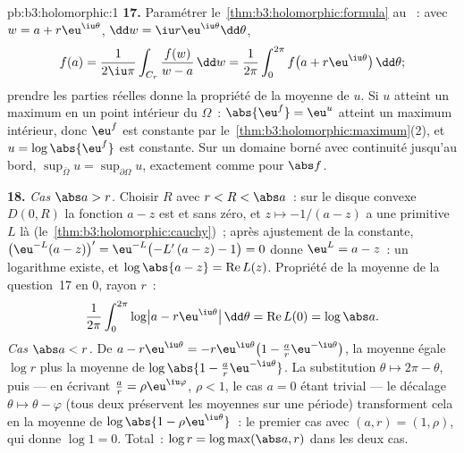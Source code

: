 \begin{solution}{pb:b3:holomorphic:1}
\textbf{17.} Paramétrer le~\cref{thm:b3:holomorphic:formula}
au ~: avec $w = a + r\eu^{\iu\theta}$, $\dd w = \iu
r\eu^{\iu\theta}\dd\theta$,
\[
f(a) = \frac1{2\iu\pi}\int_{C_r}\frac{f(w)}{w - a}\,\dd w
= \frac1{2\pi}\int_0^{2\pi}
f\bigl(a + r\eu^{\iu\theta}\bigr)\,\dd\theta ;
\]
prendre les parties réelles donne la propriété de la moyenne
de $u$. Si $u$ atteint un maximum en un point intérieur du
 $\Omega$~: $\abs{\eu^f} = \eu^u$ atteint un maximum
intérieur, donc $\eu^f$ est constante par
le~\cref{thm:b3:holomorphic:maximum}(2), et $u =
\log\abs{\eu^f}$ est constante. Sur un domaine borné avec
continuité jusqu'au bord, $\sup_{\bar\Omega}u =
\sup_{\partial\Omega}u$, exactement comme pour $\abs f$.

\textbf{18.} \emph{Cas $\abs a > r$.} Choisir $R$ avec $r <
R < \abs a$~: sur le disque convexe $D(0, R)$ la fonction $a
- z$ est  et sans zéro, et $z \mapsto -1/(a - z)$
a une primitive $L$ là
(le~\cref{thm:b3:holomorphic:cauchy})~; après ajustement de
la constante, $\bigl(\eu^{-L}(a - z)\bigr)' =
\eu^{-L}\bigl(-L'\,(a - z) - 1\bigr) = 0$ donne $\eu^L = a -
z$~: un logarithme  existe, et $\log\abs{a - z} =
\operatorname{Re}L(z)$. Propriété de la moyenne de la
question~17 en $0$, rayon $r$~:
\[
\frac1{2\pi}\int_0^{2\pi}
\log\bigl|a - r\eu^{\iu\theta}\bigr|\,\dd\theta
= \operatorname{Re}L(0) = \log\abs a .
\]
\emph{Cas $\abs a < r$.} De $a - r\eu^{\iu\theta} =
-r\eu^{\iu\theta}\bigl(1 - \frac ar\eu^{-\iu\theta}\bigr)$,
la moyenne égale $\log r$ plus la moyenne de $\log\abs{1 -
\frac ar\eu^{-\iu\theta}}$. La substitution $\theta \mapsto
2\pi - \theta$, puis --- en écrivant $\frac ar =
\rho\eu^{\iu\varphi}$, $\rho < 1$, le cas $a = 0$ étant
trivial --- le décalage $\theta \mapsto \theta - \varphi$
(tous deux préservent les moyennes sur une période)
transforment cela en la moyenne de $\log\abs{1 -
\rho\eu^{\iu\theta}}$~: le premier cas avec $(a, r) = (1,
\rho)$, qui donne $\log 1 = 0$. Total~: $\log r =
\log\max(\abs a, r)$ dans les deux cas.


\end{solution}
